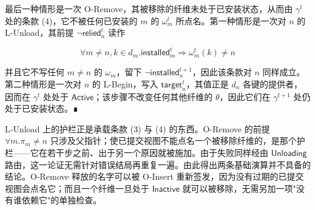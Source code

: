 最后一种情形是一次 O-Remove，其被移除的纤维未处于已安装状态，从而由 $\gamma ^ { t }$ 处的条款 (4)，它不被任何已安装的 $m$ 的 $\omega _ { m } ^ { t }$ 所点名。第一种情形是一次对 $n$ 的 L-Unload，其前提 $\neg \mathsf { r e l i e d } _ { n } ^ { t }$ 读作

\[
\forall m \neq n , k \in d _ { m } . \mathsf { i n s t a l l e d } _ { m } ^ { t } \Rightarrow \omega _ { m } ^ { t } ( k ) \neq n
\]

并且它不写任何 $m \neq n$ 的 $\omega _ { m }$，留下 $\neg \mathsf { i n s t a l l e d } _ { n } ^ { t + 1 }$，因此该条款对 $n$ 同样成立。第二种情形是一次对 $n$ 的 L-Begin，写入 $\mathsf { t a r g e t } _ { n } ^ { t }$，其值正是 $d _ { n }$ 各键的提供者，因而在 $\gamma ^ { t }$ 处处于 $\mathsf{Active}$；该步骤不改变任何其他纤维的 $\theta$，因此它们在 $\gamma ^ { t + 1 }$ 处仍处于已安装状态。∎

L-Unload 上的护栏正是承载条款 (3) 与 (4) 的东西。O-Remove 的前提 $\forall m. \pi _ { m } \neq n$ 只涉及父指针；使已提交视图不能点名一个被移除纤维的，是那个护栏——它在若干步之前、出于另一个原因就被施加。由于失败同样经由 $\mathsf{Unloading}$ 路由，这一论证无需针对错误结局再重复一遍。由此得出两条基础演算并不具备的结论。O-Remove 释放的名字可以被 O-Insert 重新签发，因为没有过期的已提交视图会点名它；而且一个纤维一旦处于 $\mathsf{Inactive}$ 就可以被移除，无需另加一项"没有谁依赖它"的单独检查。
